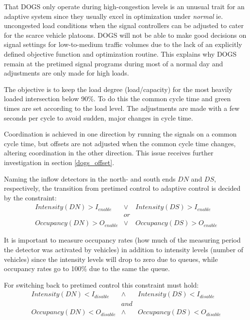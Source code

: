 That DOGS only operate during high-congestion levels is an unusual trait for an adaptive system since they usually excel in optimization under \textit{normal} ie. uncongested load conditions when the signal controllers can be adjusted to cater for the scarce vehicle platoons.
DOGS will not be able to make good decisions on signal settings for low-to-medium traffic volumes due to the lack of an explicitly defined objective function and optimization routine. This explains why DOGS remain at the pretimed signal programs during most of a normal day and adjustments are only made for high loads.

The objective is to keep the load degree (load/capacity) for the most heavily loaded intersection below 90\%.
To do this the common cycle time and green times are set according to the load level. The adjustments are made with a few seconds per cycle to avoid sudden, major changes in cycle time.

Coordination is achieved in one direction by running the signals on a common cycle time, but offsets are not adjusted when the common cycle time changes, altering coordination in the other direction. This issue receives further investigation in section \ref{dogs_offset}.

Naming the inflow detectors in the north- and south ends $DN$ and $DS$, respectively, the transition from pretimed control to adaptive control is decided by the constraint:
\begin{eqnarray*}
Intensity(DN) > I_{enable} & \vee & Intensity(DS) > I_{enable} \\
& or & \\
Occupancy(DN) > O_{enable} & \vee & Occupancy(DS) > O_{enable}
\end{eqnarray*}

It is important to measure occupancy rates (how much of the measuring period the detector was activated by vehicles) in addition to intensity levels (number of vehicles) since the intensity levels will drop to zero due to queues, while occupancy rates go to 100\% due to the same the queue.

For switching back to pretimed control this constraint must hold:
\begin{eqnarray*}
Intensity(DN) < I_{disable} & \wedge & Intensity(DS) < I_{disable} \\
& and & \\
Occupancy(DN) < O_{disable} & \wedge & Occupancy(DS) < O_{disable}
\end{eqnarray*}

